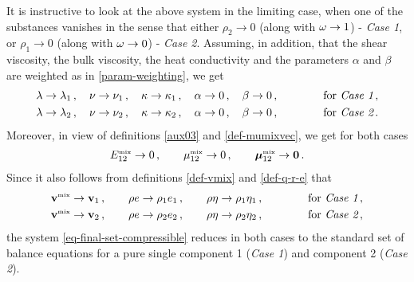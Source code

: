 \documentclass[a4paper]{article}
\begin{document}
\begin{remark}
\label{remark-limiting-to-pure-states}
It is instructive to look at the above system in the limiting case, when one of the substances vanishes in the sense that either $\rho_2\rightarrow 0$ (along with $\omega\rightarrow 1$) - {\it Case 1}, or $\rho_1\rightarrow 0$ (along with $\omega\rightarrow 0$) - {\it Case 2}. Assuming, in addition, that the shear viscosity, the bulk viscosity, the heat conductivity and the parameters $\alpha$ and $\beta$ are weighted as in \eqref{param-weighting}, we get \begin{align}
\nonumber
\lambda\rightarrow \lambda_1\,,\quad
\nu\rightarrow \nu_1\,,\quad
\kappa\rightarrow \kappa_1\,,\quad
\alpha\rightarrow 0\,,\quad
\beta\rightarrow 0\,,\qquad\qquad\text{for {\it Case 1}}\,,\\
\nonumber
\lambda\rightarrow \lambda_2\,,\quad
\nu\rightarrow \nu_2\,,\quad
\kappa\rightarrow \kappa_2\,,\quad
\alpha\rightarrow 0\,,\quad
\beta\rightarrow 0\,,\qquad\qquad\text{for {\it Case 2}}\,.
\end{align}
Moreover, in view of definitions \eqref{aux03} and \eqref{def-mumixvec}, we get for both cases
\begin{align}
E_{12}^{\mbox{\tiny{mix}}}\rightarrow 0\,,\qquad\mu_{12}^{\mbox{\tiny{mix}}}\rightarrow 0\,,\qquad \boldsymbol{\mu}_{12}^{\mbox{\tiny{mix}}}\rightarrow {\bf 0}\,.
\end{align}
Since it also follows from definitions \eqref{def-vmix} and \eqref{def-q-r-e} that 
\begin{align}
\nonumber
&{\bf v}^{\mbox{\tiny{mix}}}\rightarrow{\bf v}_1\,,\qquad \rho e\rightarrow \rho_1 e_1\,,\qquad \rho\eta\rightarrow \rho_1\eta_1\,,\qquad\qquad{\text{for {\it Case 1}}}\,,\\
\nonumber
&{\bf v}^{\mbox{\tiny{mix}}}\rightarrow{\bf v}_2\,,\qquad \rho e\rightarrow \rho_2 e_2\,,\qquad \rho\eta\rightarrow \rho_2\eta_2\,,\qquad\qquad{\text{for {\it Case 2}}}\,,
\end{align}
the system \eqref{eq-final-set-compressible} reduces in both cases to the standard set of balance equations for a pure single component 1 ({\it Case 1}) and component 2 ({\it Case 2}).
\end{remark}
\end{document}
